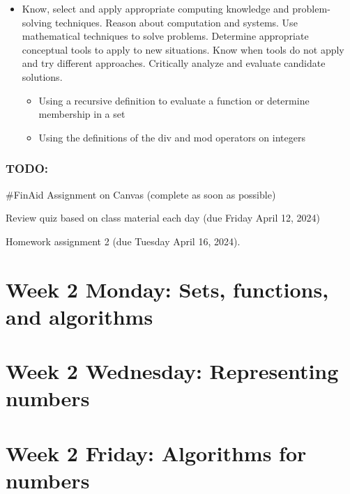 \begin{itemize}
\item Know, select and apply appropriate computing knowledge and problem-solving techniques. Reason about computation and systems. Use mathematical techniques to solve problems. Determine appropriate conceptual tools to apply to new situations. Know when tools do not apply and try different approaches. Critically analyze and evaluate candidate solutions.
\begin{itemize}
    \item Using a recursive definition to evaluate a function or determine membership in a set
    \item Using the definitions of the div and mod operators on integers
\end{itemize}

\end{itemize}

\subsubsection*{TODO:}
\begin{list}
   {\itemsep2pt}
   \item \#FinAid Assignment on Canvas (complete as soon as possible) 
   \item Review quiz based on class material each day (due Friday April 12, 2024)
   \item Homework assignment 2 (due Tuesday April 16, 2024).
\end{list}

\newpage

\section*{Week 2 Monday: Sets, functions, and algorithms}

\newpage



\section*{Week 2 Wednesday: Representing numbers}


\vfill
\newpage





\newpage
\section*{Week 2 Friday: Algorithms for numbers}





%
\newpage


\newpage

\newpage
